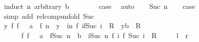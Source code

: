 \begin{isabellebody}
%
\isadelimproof
%
\endisadelimproof
%
\isatagproof
{}\isamarkupfalse%
\ {\isacharparenleft}{\kern0pt}induct\ n\ arbitrary{\isacharcolon}{\kern0pt}\ b{\isacharparenright}{\kern0pt}\isanewline
\ \ \isamarkupfalse%
\ {}\isanewline
\ \ \isamarkupfalse%
\ {\isacharquery}{\kern0pt}case\ \isamarkupfalse%
\ auto\isanewline
{}\isamarkupfalse%
\isanewline
\ \ \isamarkupfalse%
\ {\isacharparenleft}{\kern0pt}Suc\ n{\isacharparenright}{\kern0pt}\isanewline
\ \ \isamarkupfalse%
\ {\isacharquery}{\kern0pt}case\isanewline
\ \ \isamarkupfalse%
\ {\isacharparenleft}{\kern0pt}simp\ add{\isacharcolon}{\kern0pt}\ relcomp{\isacharunderscore}{\kern0pt}unfold\ Suc{\isacharparenright}{\kern0pt}\isanewline
\ \ \ \ \isamarkupfalse%
\ {\isachardoublequoteopen}{\isacharparenleft}{\kern0pt}{\isasymexists}y{\isachardot}{\kern0pt}\ {\isacharparenleft}{\kern0pt}{\isasymexists}f{\isachardot}{\kern0pt}\ f\ {}\ {\isacharequal}{\kern0pt}\ a\ {\isasymand}\ f\ n\ {\isacharequal}{\kern0pt}\ y\ {\isasymand}\ {\isacharparenleft}{\kern0pt}{\isasymforall}i{\isacharless}{\kern0pt}n{\isachardot}{\kern0pt}\ {\isacharparenleft}{\kern0pt}f\ i{\isacharcomma}{\kern0pt}f{\isacharparenleft}{\kern0pt}Suc\ i{\isacharparenright}{\kern0pt}{\isacharparenright}{\kern0pt}\ {\isasymin}\ R{\isacharparenright}{\kern0pt}{\isacharparenright}{\kern0pt}\ {\isasymand}\ {\isacharparenleft}{\kern0pt}y{\isacharcomma}{\kern0pt}b{\isacharparenright}{\kern0pt}\ {\isasymin}\ R{\isacharparenright}{\kern0pt}\ {\isasymlongleftrightarrow}\isanewline
\ \ \ \ \ \ {\isacharparenleft}{\kern0pt}{\isasymexists}f{\isachardot}{\kern0pt}\ f\ {}\ {\isacharequal}{\kern0pt}\ a\ {\isasymand}\ f{\isacharparenleft}{\kern0pt}Suc\ n{\isacharparenright}{\kern0pt}\ {\isacharequal}{\kern0pt}\ b\ {\isasymand}\ {\isacharparenleft}{\kern0pt}{\isasymforall}i{\isacharless}{\kern0pt}Suc\ n{\isachardot}{\kern0pt}\ {\isacharparenleft}{\kern0pt}f\ i{\isacharcomma}{\kern0pt}\ f\ {\isacharparenleft}{\kern0pt}Suc\ i{\isacharparenright}{\kern0pt}{\isacharparenright}{\kern0pt}\ {\isasymin}\ R{\isacharparenright}{\kern0pt}{\isacharparenright}{\kern0pt}{\isachardoublequoteclose}\isanewline
\ \ \ \ {\isacharparenleft}{\kern0pt}\ {\isachardoublequoteopen}{\isacharquery}{\kern0pt}l\ {\isacharequal}{\kern0pt}\ {\isacharquery}{\kern0pt}r{\isachardoublequoteclose}{\isacharparenright}{\kern0pt}\isanewline
\ \ \ \ \isamarkupfalse%
\isanewline
\ \ \ \ \ \ \isamarkupfalse%

\end{isabellebody}
